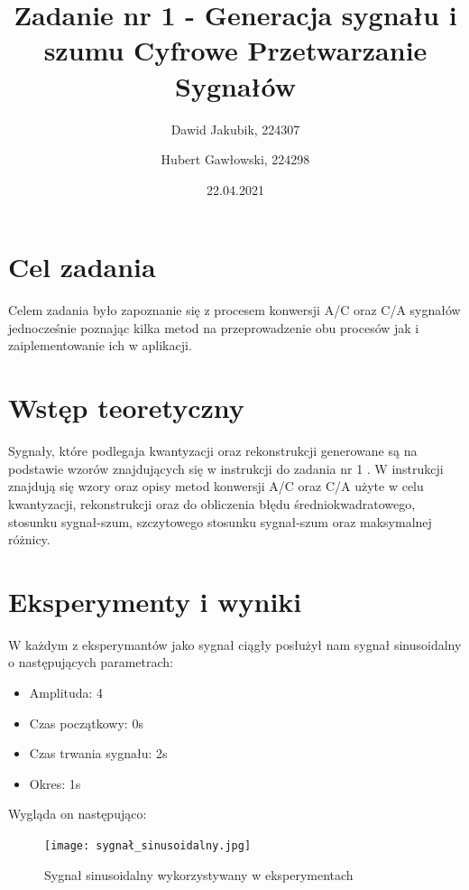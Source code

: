 \documentclass[12pt]{article}
\title{{\bf Zadanie nr 1 - Generacja sygnału i szumu}\linebreak
Cyfrowe Przetwarzanie Sygnałów}
\author{Dawid Jakubik, 224307 \and Hubert Gawłowski, 224298}
\date{22.04.2021}
\begin{document}
\clearpage\maketitle
\thispagestyle{empty}
\newpage
\setcounter{page}{1}
\section{Cel zadania}

Celem zadania było zapoznanie się z procesem konwersji A/C oraz C/A sygnałów jednocześnie poznając kilka metod na przeprowadzenie obu procesów jak i zaiplementowanie ich w aplikacji. 

\section{Wstęp teoretyczny}

Sygnały, które podlegaja kwantyzacji oraz rekonstrukcji generowane są na podstawie wzorów znajdujących się w instrukcji do zadania nr 1 \cite{instrukcja1}. W instrukcji \cite{instrukcji2} znajdują się wzory oraz opisy metod konwersji A/C oraz C/A użyte w celu kwantyzacji, rekonstrukcji oraz do obliczenia błędu średniokwadratowego, stosunku sygnał-szum, szczytowego stosunku sygnał-szum oraz maksymalnej różnicy.


\section{Eksperymenty i wyniki}

W każdym z eksperymantów jako sygnał ciągły posłużył nam sygnał sinusoidalny o następujących parametrach: 
\begin{itemize}
	\item Amplituda: 4
	\item Czas początkowy: 0s
	\item Czas trwania sygnału: 2s
	\item Okres: 1s
\end{itemize}
Wygląda on następująco:
\begin{figure}[H]
    \centering
	\texttt{[image: sygnał\_sinusoidalny.jpg]}
    \caption{Sygnał sinusoidalny wykorzystywany w eksperymentach}
    \label{wykres dla eksperymentu 1}
\end{figure}
\end{document}
